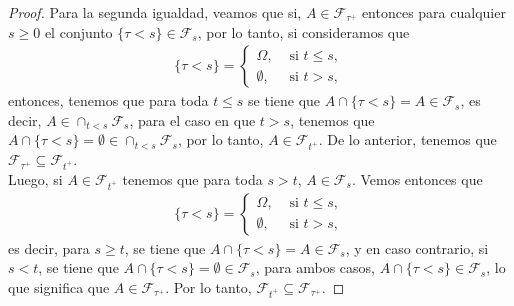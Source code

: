 \begin{proof}
Para la segunda igualdad, veamos que si, $A \in \mathcal{F}_{\tau^{+}}$ entonces para cualquier $s \geq 0$ el conjunto $\{ \tau < s \} \in \mathcal{F}_s$, por lo tanto, si consideramos que 
\begin{align*}
	\{ \tau < s \} = 
    \begin{cases}
	\Omega, & \text{ si } t \leq s, \\
    \emptyset, & \text{ si } t > s,
	\end{cases}
\end{align*}
entonces, tenemos que para toda $t \leq s$ se tiene que $A \cap \{ \tau < s \} = A \in \mathcal{F}_s$, es decir, $A \in \cap_{t < s} \mathcal{F}_s$, para el caso en que $t > s$, tenemos que $A \cap \{ \tau < s \} = \emptyset \in \cap_{t < s} \mathcal{F}_s$, por lo tanto, $A \in \mathcal{F}_{t^{+}}$. De lo anterior, tenemos que $\mathcal{F}_{\tau^{+}} \subseteq \mathcal{F}_{t^{+}}$. \\

Luego, si $A \in \mathcal{F}_{t^{+}}$  tenemos que para toda $s > t$, $A \in \mathcal{F}_s$. Vemos entonces que
\begin{align*}
	\{ \tau < s \} = 
    \begin{cases}
	\Omega, & \text{ si } t \leq s, \\
    \emptyset, & \text{ si } t > s,
	\end{cases}
\end{align*}
es decir, para $s \geq t$, se tiene que $A \cap \{ \tau < s \} = A \in \mathcal{F}_s$, y en caso contrario, si $s < t$, se tiene que $A \cap \{ \tau < s \} = \emptyset \in \mathcal{F}_s$, para ambos casos, $A \cap \{ \tau < s \} \in \mathcal{F}_s$, lo que significa que $A \in \mathcal{F}_{\tau^{+}}$. Por lo tanto, $\mathcal{F}_{t^{+}} \subseteq \mathcal{F}_{\tau^{+}}$.
\end{proof}



